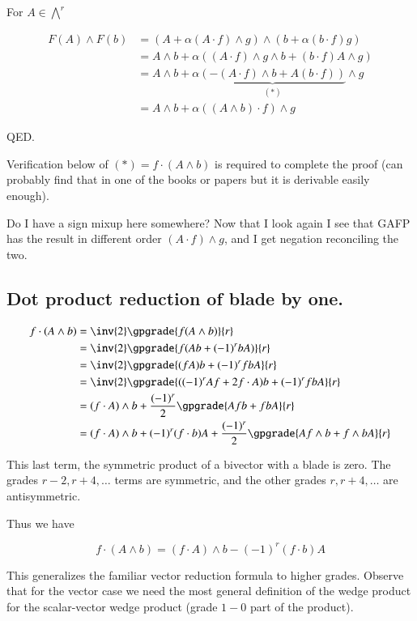 For $A \in {\bigwedge}^r$

\begin{align*}
F(A) \wedge F(b)
&= \left(A + \alpha (A \cdot f) \wedge g \right) \wedge
   \left(b + \alpha(b \cdot f) g \right) \\
&= A \wedge b
 + \alpha 
\left(
(A \cdot f) \wedge g \wedge b
+ (b \cdot f) A \wedge g 
\right) \\
&= A \wedge b
 + \alpha 
\underbrace{
\left(
-(A \cdot f) \wedge b
+ A (b \cdot f) 
\right)
}_{(*)} 
\wedge g
\\
&= A \wedge b + \alpha ((A \wedge b) \cdot f) \wedge g
\end{align*}

QED.

Verification below of $(*) = f \cdot (A \wedge b)$ is required to complete the proof (can probably find that in one of the books or papers but it is derivable
easily enough).

Do I have a sign mixup here somewhere?  Now that I look again I see that GAFP
has the result in different order $(A \cdot f) \wedge g$, and I get negation
reconciling the two.

\subsection{Dot product reduction of blade by one. }

\begin{align*}
f \cdot (A \wedge b)
&= \inv{2} \gpgrade{f (A \wedge b)}{r} \\
&= \inv{2} \gpgrade{f (A b + (-1)^r b A)}{r} \\
&= \inv{2} \gpgrade{(f A) b + (-1)^r f b A}{r} \\
&= \inv{2} \gpgrade{((-1)^r A f + 2 f \cdot A) b + (-1)^r f b A}{r} \\
&= (f \cdot A) \wedge b + \frac{(-1)^r}{2} \gpgrade{A f b + f b A}{r} \\
&= (f \cdot A) \wedge b + (-1)^r (f \cdot b) A
+ \frac{(-1)^r}{2} \gpgrade{A f \wedge b + f \wedge b A}{r} \\
\end{align*}

This last term, the symmetric product of a bivector with a blade is zero.
The grades $r-2, r+4, \ldots$ terms are symmetric, and the other grades
$r, r+4, \ldots$ are antisymmetric.

Thus we have

\begin{equation}
f \cdot (A \wedge b)
= (f \cdot A) \wedge b - (-1)^r (f \cdot b) A
\end{equation}

This generalizes the familiar vector reduction formula to higher grades.
Observe that for the vector case we need the most general definition
of the wedge product for the scalar-vector wedge product (grade $1-0$ part of the product).


